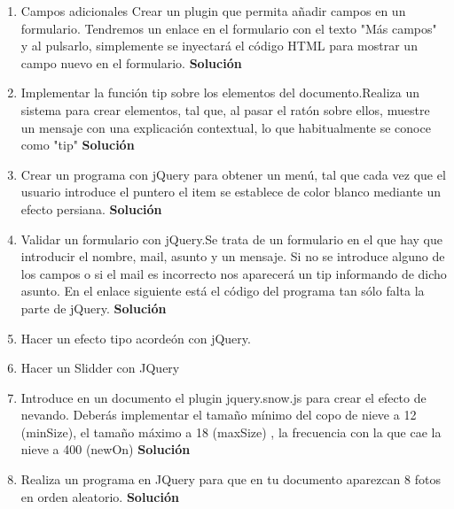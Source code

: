 \documentclass[a4paper, oneside]{article}
\begin{document}
\begin{enumerate}
\item Campos adicionales Crear un plugin que permita añadir campos en un formulario. Tendremos un enlace en el formulario con el texto "Más campos" y al pulsarlo, simplemente se inyectará el código HTML para mostrar un campo nuevo en el formulario. \textbf{Solución}

\item Implementar la función tip sobre los elementos del documento.Realiza  un sistema para crear elementos, tal que, al pasar el ratón sobre ellos, muestre un mensaje con una explicación contextual, lo que habitualmente se conoce como "tip" \textbf{Solución}

\item Crear un programa con jQuery para obtener un menú, tal que cada vez que el usuario introduce el puntero  el item se establece de color blanco mediante un efecto persiana. \textbf{Solución}

\item Validar un formulario con jQuery.Se trata de un formulario en el que hay que introducir el nombre,  mail,  asunto y un mensaje. Si no se introduce alguno de los campos o si el mail es incorrecto nos aparecerá un tip informando de dicho asunto. En el enlace siguiente está el código del programa tan sólo falta la parte de jQuery. \textbf{Solución}

\item Hacer un efecto tipo acordeón con jQuery.

\item Hacer un Slidder con JQuery

\item Introduce en un documento el plugin jquery.snow.js para crear el efecto de nevando. Deberás implementar el tamaño mínimo del copo de nieve a 12 (minSize), el tamaño máximo a 18 (maxSize) , la frecuencia con la que cae la nieve a 400 (newOn) \textbf{Solución}

\item Realiza un programa en JQuery para que en tu documento aparezcan 8 fotos en orden aleatorio. \textbf{Solución}
\end{enumerate}
\end{document}
